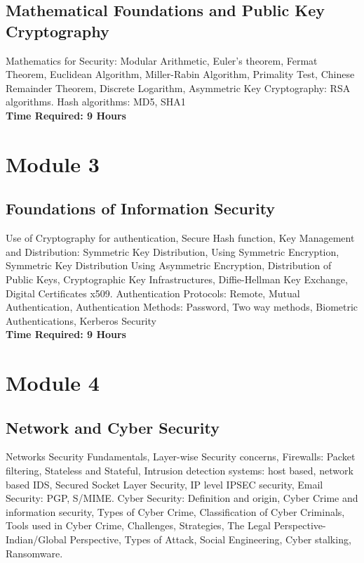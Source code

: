 \documentclass[openany]{book}
\begin{document}
\subsection{Mathematical Foundations and Public Key Cryptography}
Mathematics for Security: Modular Arithmetic, Euler's theorem, Fermat Theorem, Euclidean
Algorithm, Miller-Rabin Algorithm, Primality Test, Chinese Remainder Theorem, Discrete
Logarithm, Asymmetric Key Cryptography: RSA algorithms. Hash algorithms: MD5, SHA1\\

\noindent
\textbf{Time Required: 9 Hours}


\section{Module 3}

\subsection{Foundations of Information Security}
Use of Cryptography for authentication, Secure Hash function, Key Management and Distribution:
Symmetric Key Distribution, Using Symmetric Encryption, Symmetric Key Distribution Using
Asymmetric Encryption, Distribution of Public Keys, Cryptographic Key Infrastructures, Diffie-Hellman Key Exchange, Digital Certificates x509.
Authentication Protocols: Remote, Mutual Authentication, Authentication Methods: Password,
Two way methods, Biometric Authentications, Kerberos Security\\



\noindent
\textbf{Time Required: 9 Hours}


\section{Module 4}

\subsection{Network and Cyber Security}
Networks Security Fundamentals, Layer-wise Security concerns, Firewalls: Packet filtering,
Stateless and Stateful, Intrusion detection systems: host based, network based IDS, Secured Socket
Layer Security, IP level IPSEC security, Email Security: PGP, S/MIME.
Cyber Security: Definition and origin, Cyber Crime and information security, Types of Cyber
Crime, Classification of Cyber Criminals, Tools used in Cyber Crime, Challenges, Strategies, The
Legal Perspective-Indian/Global Perspective, Types of Attack, Social Engineering, Cyber stalking,
Ransomware.\\
\end{document}
